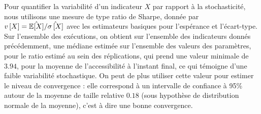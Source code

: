 Pour quantifier la variabilité d'un indicateur $X$ par rapport à la stochasticité, nous utilisons une mesure de type ratio de Sharpe, donnée par $v\left[X\right] = \hat{\operatorname{\mathbb{E}}\!\left[X\right]}/\hat{\sigma\left[X\right]}$ avec les estimateurs basiques pour l'espérance et l'écart-type. Sur l'ensemble des exécutions, on obtient sur l'ensemble des indicateurs donnés précédemment, une médiane estimée sur l'ensemble des valeurs des paramètres, pour le ratio estimé au sein des réplications, qui prend une valeur minimale de $3.94$, pour la moyenne de l'accessibilité à l'instant final, ce qui témoigne d'une faible variabilité stochastique. On peut de plus utiliser cette valeur pour estimer le niveau de convergence : elle correspond à un intervalle de confiance à 95\% autour de la moyenne de taille relative $0.18$ (sous hypothèse de distribution normale de la moyenne), c'est à dire une bonne convergence.



